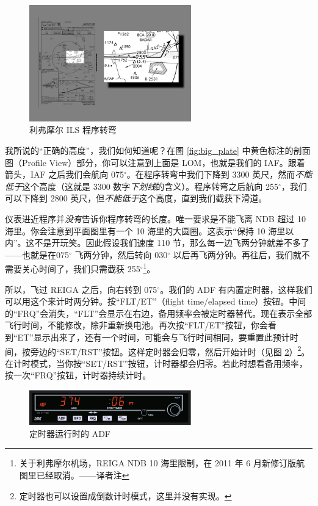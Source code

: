 \begin{figure}
  \begin{center}
    \includegraphics[width=7cm]{img/PT}
    \caption{利弗摩尔 ILS 程序转弯}
    \label{fig:PT}
  \end{center}
\end{figure}

我所说的“正确的高度”，我们如何知道呢？在图 \ref{fig:big_plate} 中黄色标注的剖面图（Profile View）部分，你可以注意到上面是 LOM，也就是我们的 IAF。跟着箭头，IAF 之后我们会航向 075$^\circ$。在程序转弯中我们下降到 3300 英尺，然而\emph{不能低于}这个高度（这就是 3300 数字\emph{下划线}的含义）。程序转弯之后航向 255$^\circ$，我们可以下降到 2800 英尺，但\emph{不能低于}这个高度，直到我们截获下滑道。

仪表进近程序并\emph{没有}告诉你程序转弯的长度。唯一要求是不能飞离 NDB 超过 10 海里。你会注意到平面图里有一个 10 海里的大圆圈。这表示“保持 10 海里以内”。这不是开玩笑。因此假设我们速度 110 节，那么每一边飞两分钟就差不多了——也就是在075$^\circ$ 飞两分钟，然后转向 030$^\circ$ 以后再飞两分钟。再往后，我们就不需要关心时间了，我们只需截获 255$^\circ$\footnote{关于利弗摩尔机场，REIGA NDB 10 海里限制，在 2011 年 6 月新修订版航图里已经取消。——译者注}。

所以，飞过 REIGA 之后，向右转到 075$^\circ$。我们的 ADF 有内置定时器，这样我们可以用这个来计时两分钟。按“FLT/ET”（flight time/elapsed time）按钮。中间的“FRQ”会消失，“FLT”会显示在右边，备用频率会被定时器替代。现在表示全部飞行时间，不能修改，除非重新换电池。再次按“FLT/ET”按钮，你会看到“ET”显示出来了，还有一个时间，可能会与飞行时间相同，要重置此预计时间，按旁边的“SET/RST”按钮。这样定时器会归零，然后开始计时（见图 \ref{fig:ADF}）\footnote{定时器也可以设置成倒数计时模式，这里并没有实现。}。在计时模式，当你按“SET/RST”按钮，计时器都会归零。若此时想看备用频率，按一次“FRQ”按钮，计时器持续计时。

\begin{figure}
  \begin{center}
    \includegraphics[width=7cm]{img/ADF}
    \caption{定时器运行时的 ADF}
    \label{fig:ADF}
  \end{center}
\end{figure}

